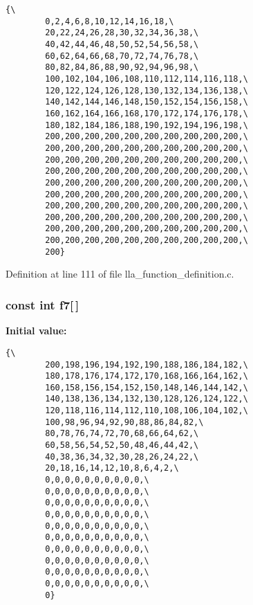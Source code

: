 \footnotesize\begin{verbatim}{\
        0,2,4,6,8,10,12,14,16,18,\
        20,22,24,26,28,30,32,34,36,38,\
        40,42,44,46,48,50,52,54,56,58,\
        60,62,64,66,68,70,72,74,76,78,\
        80,82,84,86,88,90,92,94,96,98,\
        100,102,104,106,108,110,112,114,116,118,\
        120,122,124,126,128,130,132,134,136,138,\
        140,142,144,146,148,150,152,154,156,158,\
        160,162,164,166,168,170,172,174,176,178,\
        180,182,184,186,188,190,192,194,196,198,\
        200,200,200,200,200,200,200,200,200,200,\
        200,200,200,200,200,200,200,200,200,200,\
        200,200,200,200,200,200,200,200,200,200,\
        200,200,200,200,200,200,200,200,200,200,\
        200,200,200,200,200,200,200,200,200,200,\
        200,200,200,200,200,200,200,200,200,200,\
        200,200,200,200,200,200,200,200,200,200,\
        200,200,200,200,200,200,200,200,200,200,\
        200,200,200,200,200,200,200,200,200,200,\
        200,200,200,200,200,200,200,200,200,200,\
        200}
\end{verbatim}\normalsize 


Definition at line 111 of file lla\_\-function\_\-definition.c.
\subsubsection{\setlength{\rightskip}{0pt plus 5cm}const int {\bf f7}[$\,$]}\label{lla__function__definition_8c_a6}


{\bf Initial value:}

\footnotesize\begin{verbatim}{\
        200,198,196,194,192,190,188,186,184,182,\
        180,178,176,174,172,170,168,166,164,162,\
        160,158,156,154,152,150,148,146,144,142,\
        140,138,136,134,132,130,128,126,124,122,\
        120,118,116,114,112,110,108,106,104,102,\
        100,98,96,94,92,90,88,86,84,82,\
        80,78,76,74,72,70,68,66,64,62,\
        60,58,56,54,52,50,48,46,44,42,\
        40,38,36,34,32,30,28,26,24,22,\
        20,18,16,14,12,10,8,6,4,2,\
        0,0,0,0,0,0,0,0,0,0,\
        0,0,0,0,0,0,0,0,0,0,\
        0,0,0,0,0,0,0,0,0,0,\
        0,0,0,0,0,0,0,0,0,0,\
        0,0,0,0,0,0,0,0,0,0,\
        0,0,0,0,0,0,0,0,0,0,\
        0,0,0,0,0,0,0,0,0,0,\
        0,0,0,0,0,0,0,0,0,0,\
        0,0,0,0,0,0,0,0,0,0,\
        0,0,0,0,0,0,0,0,0,0,\
        0}
\end{verbatim}\normalsize 


